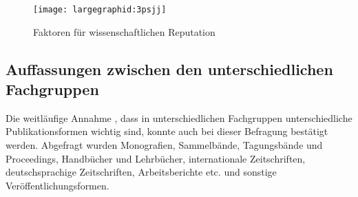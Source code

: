 \begin{figure}[h!]
\texttt{[image: largegraphid:3psjj]}
\caption{Faktoren für wissenschaftlichen Reputation}
\end{figure}

\subsection{Auffassungen zwischen den unterschiedlichen Fachgruppen}

Die weitläufige Annahme \cite{Naeder_2010}, dass in unterschiedlichen Fachgruppen unterschiedliche Publikationsformen wichtig sind, konnte auch bei dieser Befragung bestätigt werden. Abgefragt wurden Monografien, Sammelbände, Tagungsbände und Proceedings, Handbücher und Lehrbücher, internationale Zeitschriften, deutschsprachige Zeitschriften, Arbeitsberichte etc. und sonstige Veröffentlichungsformen.

